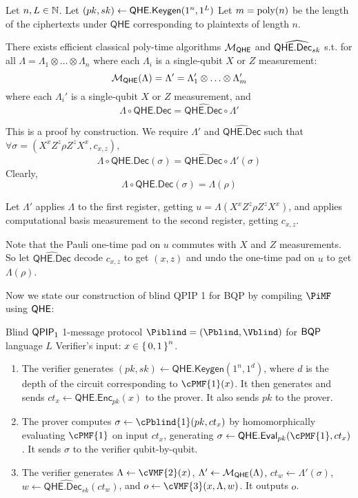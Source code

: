 \begin{thm}
	\label{decodeMeasureOrder}
	Let $n, L\in\mathbb{N}$.
	Let $(pk, sk)\leftarrow\mathsf{QHE.Keygen}(1^n, 1^L)$
	Let $m=\operatorname*{\operatorname{poly}}(n)$ be the length of the ciphertexts under $\mathsf{QHE}$ corresponding to plaintexts of length $n$.
	
	There exists efficient classical poly-time algorithms ${\cal M}_{\mathsf{QHE}}$ and $\widehat{\mathsf{QHE.Dec}_{sk}}$ s.t.
	for all $\Lambda=\Lambda_1\otimes\ldots\otimes\Lambda_n$ where each $\Lambda_i$ is a single-qubit $X$ or $Z$ measurement:
	$${\cal M}_{\mathsf{QHE}}(\Lambda)=\Lambda'=\Lambda'_1\otimes\ldots\otimes\Lambda'_m$$
	where each $\Lambda_i'$ is a single-qubit $X$ or $Z$ measurement, and
	$$\Lambda\circ\mathsf{QHE.Dec}=\widehat{\mathsf{QHE.Dec}}\circ\Lambda'$$
\end{thm}
\begin{prf}
	This is a proof by construction.
	We require $\Lambda'$ and $\widehat{\mathsf{QHE.Dec}}$ such that $\forall\sigma=(X^xZ^z\rho Z^zX^x, c_{x,z})$,
	$$\Lambda\circ\mathsf{QHE.Dec}(\sigma)=\widehat{\mathsf{QHE.Dec}}\circ\Lambda'(\sigma)$$
	Clearly,
	$$\Lambda\circ\mathsf{QHE.Dec}(\sigma)=\Lambda(\rho)$$
	
	Let $\Lambda'$ applies $\Lambda$ to the first register, getting $u=\Lambda(X^xZ^z\rho Z^zX^x)$, and applies computational basis measurement to the second register, getting $c_{x, z}$.

	Note that the Pauli one-time pad on $u$ commutes with $X$ and $Z$ measurements.
	So let $\widehat{\mathsf{QHE.Dec}}$ decode $c_{x, z}$ to get $(x, z)$ and undo the one-time pad on $u$ to get $\Lambda(\rho)$.
\end{prf}

Now we state our construction of blind QPIP 1 for BQP by compiling $\PiMF$ using $\mathsf{QHE}$:

\begin{protocol}{Blind $\operatorname{\mathsf{QPIP}}_1$ 1-message protocol $\Piblind = (\Pblind, \Vblind)$ for $\operatorname{\mathsf{BQP}}$ language $L$}
	\label{proto:BlindBQP}
	Verifier's input: $x\in\set{0,1}^n$.
	
	\begin{enumerate}
		\item The verifier generates $(pk, sk)\leftarrow\mathsf{QHE.Keygen}(1^n, 1^d)$, where $d$ is the depth of the circuit corresponding to $\cPMF{1}(x)$.
			It then generates and sends $ct_x\leftarrow\mathsf{QHE.Enc}_{pk}(x)$ to the prover.
			It also sends $pk$ to the prover.
		\item The prover computes $\sigma\leftarrow\cPblind{1}(pk, ct_x)$ by homomorphically evaluating $\cPMF{1}$ on input $ct_x$, generating $\sigma\leftarrow\QEval_{pk}(\cPMF{1}, ct_x)$.
			It sends $\sigma$ to the verifier qubit-by-qubit.
		\item The verifier generates $\Lambda\leftarrow\cVMF{2}(x)$,
			$\Lambda'\leftarrow{\cal M}_{\mathsf{QHE}}(\Lambda)$,
			$ct_w\leftarrow\Lambda'(\sigma)$,
			$w\leftarrow\widehat{\mathsf{QHE.Dec}_{sk}}(ct_w)$,
			and $o\leftarrow\cVMF{3}(x, \Lambda, w)$.
			It outputs $o$.
	\end{enumerate}
\end{protocol}

